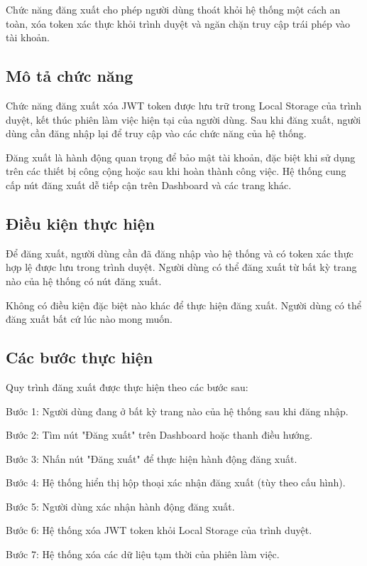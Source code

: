 Chức năng đăng xuất cho phép người dùng thoát khỏi hệ thống một cách an toàn, xóa token xác thực khỏi trình duyệt và ngăn chặn truy cập trái phép vào tài khoản.

\subsection{Mô tả chức năng}

Chức năng đăng xuất xóa JWT token được lưu trữ trong Local Storage của trình duyệt, kết thúc phiên làm việc hiện tại của người dùng. Sau khi đăng xuất, người dùng cần đăng nhập lại để truy cập vào các chức năng của hệ thống.

Đăng xuất là hành động quan trọng để bảo mật tài khoản, đặc biệt khi sử dụng trên các thiết bị công cộng hoặc sau khi hoàn thành công việc. Hệ thống cung cấp nút đăng xuất dễ tiếp cận trên Dashboard và các trang khác.

\subsection{Điều kiện thực hiện}

Để đăng xuất, người dùng cần đã đăng nhập vào hệ thống và có token xác thực hợp lệ được lưu trong trình duyệt. Người dùng có thể đăng xuất từ bất kỳ trang nào của hệ thống có nút đăng xuất.

Không có điều kiện đặc biệt nào khác để thực hiện đăng xuất. Người dùng có thể đăng xuất bất cứ lúc nào mong muốn.

\subsection{Các bước thực hiện}

Quy trình đăng xuất được thực hiện theo các bước sau:

Bước 1: Người dùng đang ở bất kỳ trang nào của hệ thống sau khi đăng nhập.

Bước 2: Tìm nút "Đăng xuất" trên Dashboard hoặc thanh điều hướng.

Bước 3: Nhấn nút "Đăng xuất" để thực hiện hành động đăng xuất.

Bước 4: Hệ thống hiển thị hộp thoại xác nhận đăng xuất (tùy theo cấu hình).

Bước 5: Người dùng xác nhận hành động đăng xuất.

Bước 6: Hệ thống xóa JWT token khỏi Local Storage của trình duyệt.

Bước 7: Hệ thống xóa các dữ liệu tạm thời của phiên làm việc.

